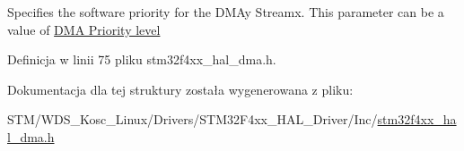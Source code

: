 Specifies the software priority for the D\+M\+Ay Streamx. This parameter can be a value of \hyperlink{group___d_m_a___priority__level}{D\+MA Priority level} 

Definicja w linii 75 pliku stm32f4xx\+\_\+hal\+\_\+dma.\+h.



Dokumentacja dla tej struktury została wygenerowana z pliku\+:\begin{DoxyCompactItemize}
\item 
S\+T\+M/\+W\+D\+S\+\_\+\+Kosc\+\_\+\+Linux/\+Drivers/\+S\+T\+M32\+F4xx\+\_\+\+H\+A\+L\+\_\+\+Driver/\+Inc/\hyperlink{stm32f4xx__hal__dma_8h}{stm32f4xx\+\_\+hal\+\_\+dma.\+h}\end{DoxyCompactItemize}
